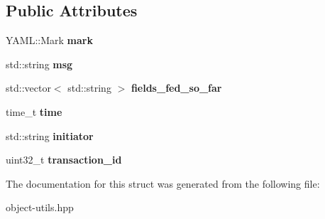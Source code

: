 \subsection*{Public Attributes}
\begin{DoxyCompactItemize}
\item 
\mbox{\label{structmods_1_1object__utils_1_1YamlFeedExceptionInfo_aa43ef81ca32c87f88601cf35e7fd77c6}} 
Y\+A\+M\+L\+::\+Mark {\bfseries mark}
\item 
\mbox{\label{structmods_1_1object__utils_1_1YamlFeedExceptionInfo_a9f2f66031d4890ce0f04b28dfae63aaf}} 
std\+::string {\bfseries msg}
\item 
\mbox{\label{structmods_1_1object__utils_1_1YamlFeedExceptionInfo_a2307d1415bed07937ee16cd08963b572}} 
std\+::vector$<$ std\+::string $>$ {\bfseries fields\+\_\+fed\+\_\+so\+\_\+far}
\item 
\mbox{\label{structmods_1_1object__utils_1_1YamlFeedExceptionInfo_a3375590d53086eb5690fa176b199b54a}} 
time\+\_\+t {\bfseries time}
\item 
\mbox{\label{structmods_1_1object__utils_1_1YamlFeedExceptionInfo_a8e586c581c55ace40b067551c8c8db6f}} 
std\+::string {\bfseries initiator}
\item 
\mbox{\label{structmods_1_1object__utils_1_1YamlFeedExceptionInfo_abaece8e5df9da4477fa9bfcabdf0e3de}} 
uint32\+\_\+t {\bfseries transaction\+\_\+id}
\end{DoxyCompactItemize}


The documentation for this struct was generated from the following file\+:\begin{DoxyCompactItemize}
\item 
object-\/utils.\+hpp\end{DoxyCompactItemize}

